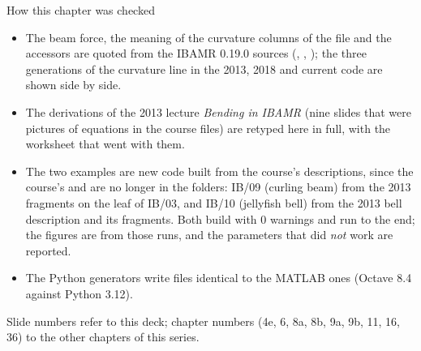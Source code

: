 \documentclass[aspectratio=169,11pt]{beamer}
\begin{document}
\begin{frame}{How this chapter was checked}
\label{fr:checked}
\begin{itemize}\footnotesize
  \item The beam force, the meaning of the curvature columns of the  file and the  accessors are quoted from the IBAMR 0.19.0 sources (, , ); the three generations of the curvature line in the 2013, 2018 and current code are shown side by side.
  \item The derivations of the 2013 lecture \emph{Bending in IBAMR} (nine slides that were pictures of equations in the course files) are retyped here in full, with the worksheet  that went with them.
  \item The two examples are new code built from the course's descriptions, since the course's  and  are no longer in the folders: IB/09 (curling beam) from the 2013  fragments on the leaf of IB/03, and IB/10 (jellyfish bell) from the 2013 bell description and its  fragments. Both build with 0 warnings and run to the end; the figures are from those runs, and the parameters that did \emph{not} work are reported.
  \item The Python generators write files identical to the MATLAB ones (Octave 8.4 against Python 3.12).
\end{itemize}
\begin{punchbox}
\footnotesize Slide numbers refer to this deck; chapter numbers (4e, 6, 8a, 8b, 9a, 9b, 11, 16, 36) to the other chapters of this series.
\end{punchbox}
\end{frame}
\end{document}
